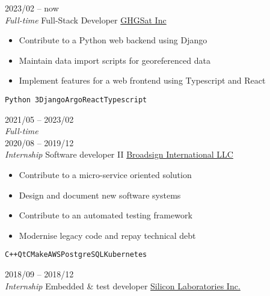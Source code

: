 \documentclass[9pt]{developercv} %
\begin{document}
\begin{minipage}[t]{0.8\textwidth}

\begin{entrylist}
	\entry
		{2023/02 -- now\\{\small\emph{Full-time}}}
		{Full-Stack Developer}
		{\href{https://ghgsat.com/en/}{GHGSat Inc}}
		{
			\vspace{-14pt}
			\begin{itemize}
				\renewcommand{\labelitemi}{\raisebox{.45ex}{\rule{.6ex}{.6ex}}}
				\setlength\itemsep{-1pt}
				\item Contribute to a Python web backend using Django
				\item Maintain data import scripts for georeferenced data
				\item Implement features for a web frontend using Typescript and React
			\end{itemize}
			\vspace{-4pt}
			\texttt{Python 3}\slashsep\texttt{Django}\slashsep\texttt{Argo}\slashsep\texttt{React}\slashsep\texttt{Typescript}
		}
	\entry
		{2021/05 -- 2023/02\\{\small\emph{Full-time}}\\2020/08 -- 2019/12\\{\small\emph{Internship}}}
		{Software developer II}
		{\href{https://broadsign.com/}{Broadsign International LLC}}
		{
			\vspace{-14pt}
			\begin{itemize}
				\renewcommand{\labelitemi}{\raisebox{.45ex}{\rule{.6ex}{.6ex}}}
				\setlength\itemsep{-1pt}
				\item Contribute to a micro-service oriented solution
				\item Design and document new software systems
				\item Contribute to an automated testing framework
				\item Modernise legacy code and repay technical debt
			\end{itemize}
			\vspace{-4pt}
			\texttt{C++}\slashsep\texttt{Qt}\slashsep\texttt{CMake}\slashsep\texttt{AWS}\slashsep\texttt{PostgreSQL}\slashsep\texttt{Kubernetes}
		}
	\entry
		{2018/09 -- 2018/12\\{\small\emph{Internship}}}
		{Embedded \& test developer}
		{\href{https://www.silabs.com/}{Silicon Laboratories Inc.}}
		{
			\vspace{-14pt}
			\begin{itemize}

\end{itemize}}
\end{entrylist}
\end{minipage}
\end{document}
